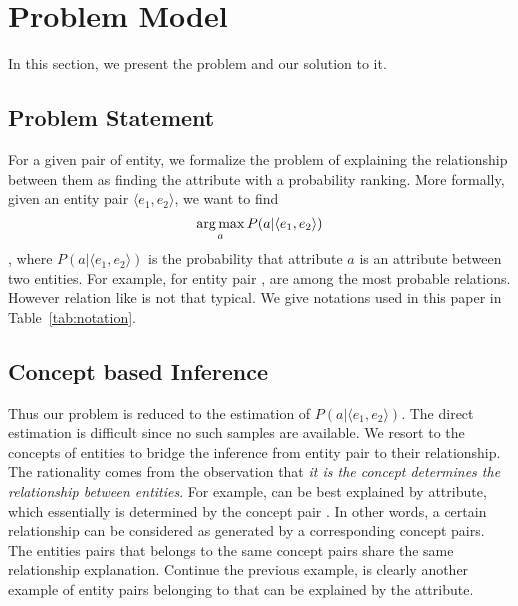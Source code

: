 
\section{Problem Model}
\label{sec:framework}

In this section, we present the problem and our solution to it.

\subsection{Problem Statement}

For a given pair of entity, we formalize the problem of explaining the relationship between them as finding the attribute with a probability ranking.
More formally, given an entity pair $ \langle e_1, e_2 \rangle $, we want to find
\begin{equation}
\operatorname*{arg\,max}_a P(a|\langle e_1,e_2 \rangle)
\end{equation},
where $P(a| \langle e_1, e_2 \rangle )$ is the probability that attribute $a$ is an attribute between two entities.
For example, for entity pair ,  are among the most probable relations.
However relation like  is not that typical. We give notations used in this paper in Table~\ref{tab:notation}.

\subsection{Concept based Inference}
Thus our problem is reduced to the estimation of $P(a| \langle e_1, e_2 \rangle )$.
The direct estimation is difficult since no such samples are available.
We resort to the concepts of entities to bridge the inference from entity pair to their relationship.
The rationality comes from the observation that {\it it is the concept determines the relationship between entities}.
For example,  can be best explained by  attribute, which essentially is determined by the concept pair .
In other words, a certain relationship can be considered as generated by a corresponding concept pairs.
The entities pairs that belongs to the same concept pairs share the same relationship explanation.
Continue the previous example,  is clearly another example of entity pairs belonging to  that can be explained by the  attribute.

